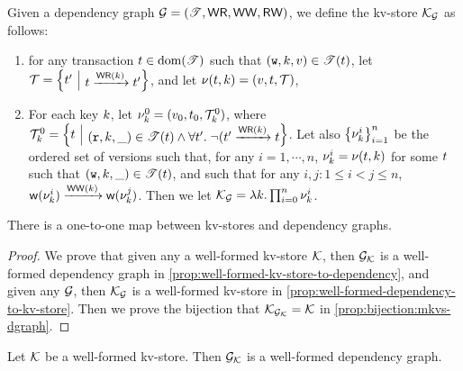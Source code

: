\begin{definition}
\label{def:dependency-to-kv-store}
Given a dependency graph $\mathcal{G} = (\mathscr{T}, \mathsf{WR}, \mathsf{WW}, \mathsf{RW})$, we define the kv-store $\mathcal{K}_{\mathcal{G}}$ as follows: 
\begin{enumerate}
\item for any transaction $t \in \operatorname{dom}(\mathscr{T})$ such that $(\textnormal{\texttt w}, k, v) \in \mathscr{T}(t)$, 
    let $\T = \Setcon{ \txid' }{ \txid \xrightarrow{\RF(\key)} \txid'}$, and let $\nu(t, k) = (v, t, \mathcal{T})$, 
\item For each key $k$, let $\nu_{k}^{0} = (v_0, t_0, \mathcal{T}_k^{0})$, where $\T_{k}^{0} = \Setcon{ \txid }{ (\otR, \key, \_) \in 
\TtoOp{T}(\txid) \wedge \forall \txid'.\; \neg( \txid' \xrightarrow{\RF(\key)} \txid }$. 
Let also  $\Set{ \ver_{\key}^{i} }_{i = 1}^{n}$ be the ordered set of versions such that, for any 
$i=1,\cdots,n$, $\nu_{k}^{i} = \nu(t, k)$ for some $t$ such that $(\textnormal{\texttt w}, k, \_) \in \mathscr{T}(t)$, 
and such that for any $i, j: 1 \leq i < j \leq n$, $\WTx(\ver_{\key}^{i}) \xrightarrow{\VO(\key)} \WTx(\ver_{\key}^{j})$. 
Then we let $\mathcal{K}_{\mathcal{G}}= \lambda k. \prod_{i=0}^{n} \nu_{k}^{i}$.
\end{enumerate}
\end{definition}

\begin{theorem}
\label{thm:kv2graph}
There is a one-to-one map between kv-stores and dependency graphs.
\end{theorem}
\begin{proof}
    We prove that given any a well-formed kv-store \( \mathcal{K} \), then $\mathcal{G}_{\mathcal{K}}$ is a well-formed dependency graph in \cref{prop:well-formed-kv-store-to-dependency},
    and given any \( \mathcal{G} \), then  $\mathcal{K}_{\mathcal{G}}$ is a well-formed kv-store in \cref{prop:well-formed-dependency-to-kv-store}.
    Then we prove the bijection that $\mathcal{K}_{\mathcal{G}_{\mathcal{K}}} = \mathcal{K}$ in \cref{prop:bijection:mkvs-dgraph}.
\end{proof}



\begin{proposition}
\label{prop:well-formed-kv-store-to-dependency}
Let $\mathcal{K}$ be a well-formed kv-store. Then $\mathcal{G}_{\mathcal{K}}$ is a well-formed dependency graph.
\end{proposition}

